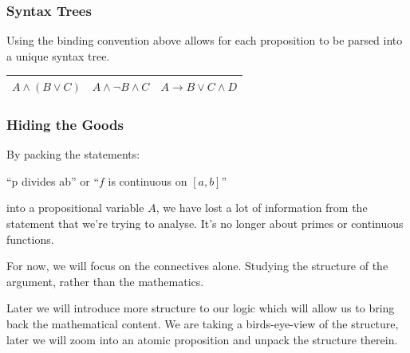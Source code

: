 \documentclass{beamer}
\begin{document}
\begin{frame}
	\frametitle{Syntax Trees}

	Using the binding convention above allows for each proposition to be parsed into a unique syntax tree. 

	\begin{table}[h]
		\centering
		\begin{tabular}{c c c}
			$A \land (B \lor C)$ \hspace{10mm} & $A \land \lnot B \land C$ \hspace{10mm} & $A \to B \lor C \land D$ \\
			\hline
		\end{tabular}
	\end{table}
	\vspace{50mm}
\end{frame}

\begin{frame}
	\frametitle{Hiding the Goods}

	By packing the statements: 
	
	\begin{center}
		``p divides ab'' or ``$f$ is continuous on $[a,b]$''
	\end{center}

	into a propositional variable $A$, we have lost a lot of information from the statement that we're trying to analyse. It's no longer about primes or continuous functions.

	\vspace{5mm}

	For now, we will focus on the connectives alone. Studying the structure of the argument, rather than the mathematics.

	\vspace{5mm}

	Later we will introduce more structure to our logic which will allow us to bring back the mathematical content. We are taking a birds-eye-view of the structure, later we will zoom into an atomic proposition and unpack the structure therein. 

\end{frame}
	
%	
%	
%
%
%
\end{document}
